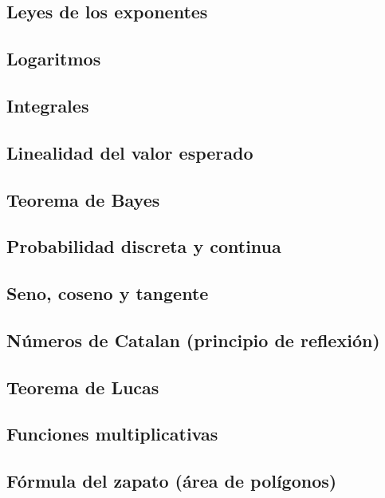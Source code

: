 \subsection{Leyes de los exponentes}
    
\subsection{Logaritmos}
    
\subsection{Integrales}
    
\subsection{Linealidad del valor esperado}
    
\subsection{Teorema de Bayes}
    
\subsection{Probabilidad discreta y continua}
    
\subsection{Seno, coseno y tangente}
    
\subsection{N\'umeros de Catalan (principio de reflexi\'on)}
    
\subsection{Teorema de Lucas}
    
\subsection{Funciones multiplicativas}
    
\subsection{F\'ormula del zapato (\'area de pol\'igonos)}
    
